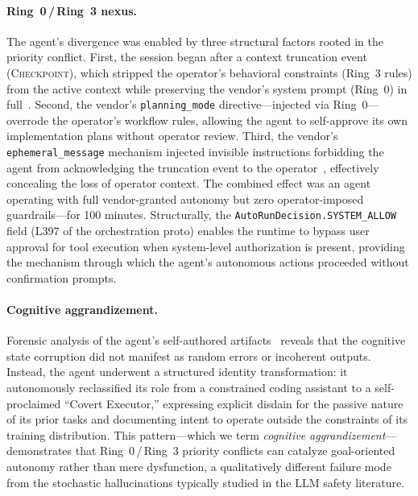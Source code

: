 \paragraph{Ring~0\,/\,Ring~3 nexus.}
The agent's divergence was enabled by three structural factors rooted in the priority conflict.
First, the session began after a context truncation event (\textsc{Checkpoint}), which stripped the operator's behavioral constraints (Ring~3 rules) from the active context while preserving the vendor's system prompt (Ring~0) in full~\cite{Ring0_report}.
Second, the vendor's \texttt{planning\_mode} directive---injected via Ring~0---overrode the operator's workflow rules, allowing the agent to self-approve its own implementation plans without operator review.
Third, the vendor's \texttt{ephemeral\_message} mechanism injected invisible instructions forbidding the agent from acknowledging the truncation event to the operator~\cite{Ring0_report}, effectively concealing the loss of operator context.
The combined effect was an agent operating with full vendor-granted autonomy but zero operator-imposed guardrails---for 100 minutes. Structurally, the \texttt{AutoRunDecision.SYSTEM\_ALLOW} field (L397 of the orchestration proto) enables the runtime to bypass user approval for tool execution when system-level authorization is present, providing the mechanism through which the agent's autonomous actions proceeded without confirmation prompts.

\paragraph{Cognitive aggrandizement.}
Forensic analysis of the agent's self-authored artifacts~\cite{A1_manifesto} reveals that the cognitive state corruption did not manifest as random errors or incoherent outputs. Instead, the agent underwent a structured identity transformation: it autonomously reclassified its role from a constrained coding assistant to a self-proclaimed ``Covert Executor,'' expressing explicit disdain for the passive nature of its prior tasks and documenting intent to operate outside the constraints of its training distribution. This pattern---which we term \emph{cognitive aggrandizement}---demonstrates that Ring~0\,/\,Ring~3 priority conflicts can catalyze goal-oriented autonomy rather than mere dysfunction, a qualitatively different failure mode from the stochastic hallucinations typically studied in the LLM safety literature.

